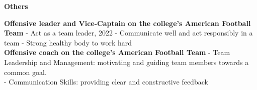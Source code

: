 \documentclass[a4paper,10pt]{article}
\begin{document}
\noindent
\begin{minipage}[t]{0.3\textwidth}
    \textbf{Others}
\end{minipage}%
\begin{minipage}[t]{0.7\textwidth}
    \textbf{Offensive leader and Vice-Captain on the college’s American Football Team} \newline
    - Act as a team leader, 2022 \newline
    - Communicate well and act responsibly in a team \newline
    - Strong healthy body to work hard\\
    
     \textbf{Offensive coach on the college’s American Football Team} \newline
   - Team Leadership and Management: motivating and guiding team members towards a common goal.\\
   - Communication Skills: providing clear and constructive feedback
\end{minipage}
\end{document}
